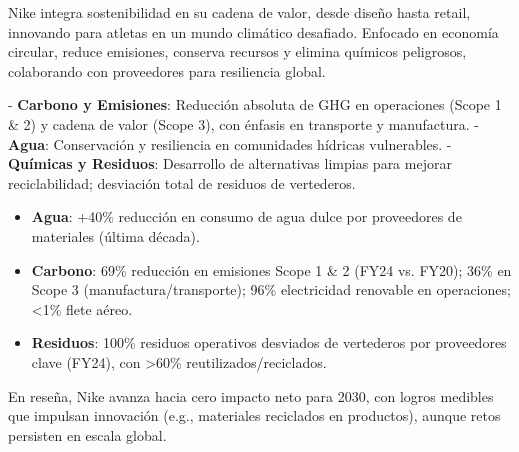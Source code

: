 Nike integra sostenibilidad en su cadena de valor, desde diseño hasta retail, innovando para atletas en un mundo climático desafiado. Enfocado en economía circular, reduce emisiones, conserva recursos y elimina químicos peligrosos, colaborando con proveedores para resiliencia global.

- \textbf{Carbono y Emisiones}: Reducción absoluta de GHG en operaciones (Scope 1 \& 2) y cadena de valor (Scope 3), con énfasis en transporte y manufactura.
- \textbf{Agua}: Conservación y resiliencia en comunidades hídricas vulnerables.
- \textbf{Químicas y Residuos}: Desarrollo de alternativas limpias para mejorar reciclabilidad; desviación total de residuos de vertederos.

\begin{itemize}
\item \textbf{Agua}: +40\% reducción en consumo de agua dulce por proveedores de materiales (última década).
\item \textbf{Carbono}: 69\% reducción en emisiones Scope 1 \& 2 (FY24 vs. FY20); 36\% en Scope 3 (manufactura/transporte); 96\% electricidad renovable en operaciones; <1\% flete aéreo.
\item \textbf{Residuos}: 100\% residuos operativos desviados de vertederos por proveedores clave (FY24), con >60\% reutilizados/reciclados.
\end{itemize}
En reseña, Nike avanza hacia cero impacto neto para 2030, con logros medibles que impulsan innovación (e.g., materiales reciclados en productos), aunque retos persisten en escala global.






